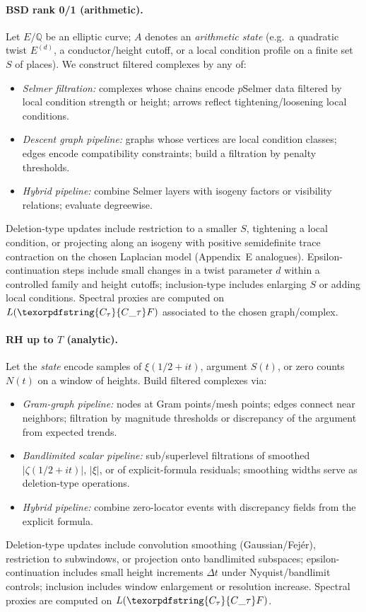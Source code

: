 \documentclass[11pt]{article}
\numberwithin{equation}{section}
\theoremstyle{plain}
\theoremstyle{definition}
\theoremstyle{remark}
\DeclareRobustCommand{\hyp}{\nobreakdash-}
\theoremstyle{plain}
\theoremstyle{definition}
\numberwithin{equation}{section}
\theoremstyle{definition}
\DeclareRobustCommand{\Ctau}{\texorpdfstring{\ensuremath{C_{\tau}}}{C\_\tau}}
\numberwithin{equation}{section}
\theoremstyle{plain}
\theoremstyle{definition}
\theoremstyle{remark}
\providecommand{\Cfun}[1]{\mathsf{C}_{#1}}
\providecommand{\Ctau}{\Cfun{\tau}}
\begin{document}
\paragraph{BSD rank 0/1 (arithmetic).}
Let \(E/\mathbb{Q}\) be an elliptic curve; \(A\) denotes an \emph{arithmetic state} (e.g.\ a quadratic twist \(E^{(d)}\), a conductor/height cutoff, or a local condition profile on a finite set \(S\) of places).
We construct filtered complexes by any of:
\begin{itemize}
  \item \emph{Selmer filtration:} complexes whose chains encode \(p\)\nobreakdash Selmer data filtered by local condition strength or height; arrows reflect tightening/loosening local conditions.
  \item \emph{Descent graph pipeline:} graphs whose vertices are local condition classes; edges encode compatibility constraints; build a filtration by penalty thresholds.
  \item \emph{Hybrid pipeline:} combine Selmer layers with isogeny factors or visibility relations; evaluate degreewise.
\end{itemize}
Deletion\hyp type updates include restriction to a smaller \(S\), tightening a local condition, or projecting along an isogeny with positive semidefinite trace contraction on the chosen Laplacian model (Appendix~E analogues).
Epsilon\hyp continuation steps include small changes in a twist parameter \(d\) within a controlled family and height cutoffs; inclusion\hyp type includes enlarging \(S\) or adding local conditions. Spectral proxies are computed on \(L(\Ctau F)\) associated to the chosen graph/complex.

\paragraph{RH up to \(T\) (analytic).}
Let the \emph{state} encode samples of \(\xi(1/2+it)\), argument \(S(t)\), or zero counts \(N(t)\) on a window of heights. Build filtered complexes via:
\begin{itemize}
  \item \emph{Gram\hyp graph pipeline:} nodes at Gram points/mesh points; edges connect near neighbors; filtration by magnitude thresholds or discrepancy of the argument from expected trends.
  \item \emph{Bandlimited scalar pipeline:} sub/superlevel filtrations of smoothed \(|\zeta(1/2+it)|\), \(|\xi|\), or of explicit\hyp formula residuals; smoothing widths serve as deletion\hyp type operations.
  \item \emph{Hybrid pipeline:} combine zero\hyp locator events with discrepancy fields from the explicit formula.
\end{itemize}
Deletion\hyp type updates include convolution smoothing (Gaussian/Fejér), restriction to subwindows, or projection onto bandlimited subspaces; epsilon\hyp continuation includes small height increments \(\Delta t\) under Nyquist/bandlimit controls; inclusion includes window enlargement or resolution increase. Spectral proxies are computed on \(L(\Ctau F)\).
\end{document}
